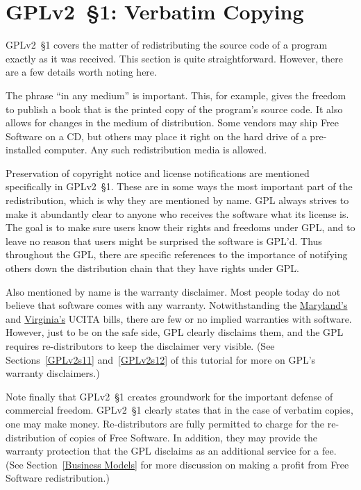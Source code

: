 \section{GPLv2~\S1: Verbatim Copying}
\label{GPLv2s1}

GPLv2~\S1 covers the matter of redistributing the source code of a program
exactly as it was received. This section is quite straightforward.
However, there are a few details worth noting here.

The phrase ``in any medium'' is important.  This, for example, gives the
freedom to publish a book that is the printed copy of the program's source
code.  It also allows for changes in the medium of distribution.  Some
vendors may ship Free Software on a CD, but others may place it right on
the hard drive of a pre-installed computer.  Any such redistribution media
is allowed.

Preservation of copyright notice and license notifications are mentioned
specifically in GPLv2~\S1.  These are in some ways the most important part of
the redistribution, which is why they are mentioned by name.  GPL
always strives to make it abundantly clear to anyone who receives the
software what its license is.  The goal is to make sure users know their
rights and freedoms under GPL, and to leave no reason that users might be
surprised the software is GPL'd. Thus
throughout the GPL, there are specific references to the importance of
notifying others down the distribution chain that they have rights under
GPL.

Also mentioned by name is the warranty disclaimer. Most people today do
not believe that software comes with any warranty.  Notwithstanding the
\href{http://mlis.state.md.us/2000rs/billfile/hb0019.htm}{Maryland's} and \href{http://leg1.state.va.us/cgi-bin/legp504.exe?001+ful+SB372ER}{Virginia's} UCITA bills, there are few or no implied warranties with software.
However, just to be on the safe side, GPL clearly disclaims them, and the
GPL requires re-distributors to keep the disclaimer very visible. (See
Sections~\ref{GPLv2s11} and~\ref{GPLv2s12} of this tutorial for more on GPL's
warranty disclaimers.)

Note finally that GPLv2~\S1 creates groundwork for the important defense of
commercial freedom.  GPLv2~\S1 clearly states that in the case of verbatim
copies, one may make money.  Re-distributors are fully permitted to charge
for the re-distribution of copies of Free Software. In addition, they may
provide the warranty protection that the GPL disclaims as an additional
service for a fee. (See Section~\ref{Business Models} for more discussion
on making a profit from Free Software redistribution.)

